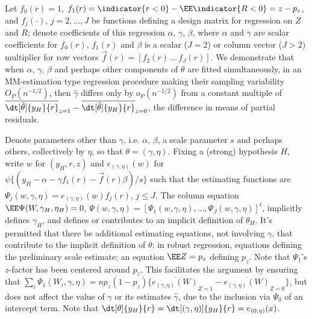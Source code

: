 Let $f_{0}(r)=1$,
$f_1(r) = \indicator{r<0} -\EE \indicator{R<0} = z - p_{z}$, and $f_j(\cdot)$, $j=2,
\ldots, J$ be functions defining  a design matrix for
regression on $Z$ and $R$; denote coefficients of this regression
$\alpha$, $\gamma$, $\beta$, where $\alpha$ and $\gamma$ are scalar
coefficients for $f_{0}(r)$, $f_{1}(r)$ and $\beta$ is a scalar
($J=2$) or column vector ($J>2$) multiplier for row vectors
$\vec{f}(r) = [f_{2}(r)\, \ldots\, f_{J}(r)]$.
We demonstrate that when $\alpha$, $\gamma$, $\beta$ and perhaps other
components of $\theta$ are fitted simultaneously,
in an MM-estimation type regression procedure making their sampling
variability $O_{P}(n^{-1/2})$,
then $\hat\gamma$ differs only by $o_{P}(n^{-1/2})$ from a constant
multiple of $\overline{\dt[\hat\theta]{y_{H}}{r}}_{z=1} - \overline{\dt[\hat\theta]{y_{H}}{r}}_{z=0}$,
the difference in means of partial residuals.

\sloppy
Denote parameters other than $\gamma$, i.e. $\alpha$, $\beta$, a
scale parameter $s$ and perhaps others, collectively by $\eta$, so that
$\theta = (\gamma, \eta)$. Fixing a (strong) hypothesis $H$, write ${w}$  for  $({y}_H,  {r}, z
)$ and $e_{(\gamma, \eta)}(w)$ for $\psi\{ (y_{H} - \alpha -
\gamma f_{1}(r) -
\vec{f}(r) \beta)/s\}$ such that
the estimating functions
are $\Psi_{j}(w, \gamma, \eta) = e_{(\gamma, \eta)}(w) f_j(r)$, $j\leq J$.  The column equation
$\EE \Psi(W, \gamma_{H}, \eta_{H}) =0$, $\Psi(w, \gamma, \eta) = [\Psi_{1}(w, \gamma, \eta), \ldots,
\Psi_{J}(w, \gamma, \eta)]^{t}$,  implicitly defines
$\gamma_{H}$, and defines or contributes to an implicit definition of
$\theta_{H}$.
It's permitted that there be additional estimating equations, not involving
$\gamma$, that contribute to the implicit definition of $\theta$:
in robust regression,  equations defining the preliminary scale
estimate; an equation $\EE Z = p_{z}$ defining $p_{z}$.  Note that
$\Psi_{1}$'s $z$-factor has been centered around $p_{z}$. This facilitates the argument by
ensuring that $\sum_{i}\Psi_{1}(W_{i}, \gamma, \eta) =
np_{z}(1-p_{z}) \{ \overline{e_{(\gamma, \eta)}(W)}_{Z=1} -
\overline{e_{(\gamma,\eta)}(W)}_{Z=0} \}$, but does
not affect the value of $\gamma$ or its estimates $\hat\gamma$, due to
the inclusion via $\Psi_{0}$ of an intercept term. Note that
$\dt[\theta]{{y_H}}{r}  = \dt[(\gamma, \eta)]{{y_H}}{r} = e_{(0, \eta)}(x)$.

